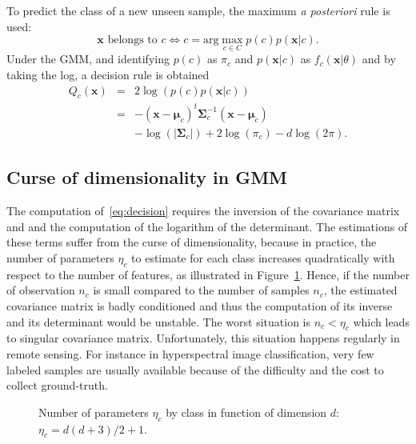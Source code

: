 \documentclass[journal,peerreview,onecolumn]{IEEEtran}
\begin{document}
    To predict the  class of a new unseen sample,  the maximum \emph{a
      posteriori}  rule  is  used:
    \begin{equation*}
        \mathbf{x} \text{ belongs to } c \Leftrightarrow c = \text{arg} \max_{c \in C} p(c) p(\mathbf{x}|c).
    \end{equation*}
    Under the GMM,  and identifying $p(c)$ as $\pi_c$  and $p(\mathbf{x}|c)$ as
    $f_c(\mathbf{x}|\theta)$ and by taking the log, a decision rule is obtained
    \begin{eqnarray}\label{eq:decision}
      Q_c(\mathbf{x}) &=& 2 \log \left( p(c) p(\mathbf{x}|c) \right) \nonumber \\
                      &=& - (\mathbf{x} - \boldsymbol{\mu}_c)^t \boldsymbol{\Sigma}_c^{-1} (\mathbf{x} - \boldsymbol{\mu}_c) \nonumber \\
                      & &-\log (|\boldsymbol{\Sigma}_c|) + 2 \log (\pi_c) - d \log (2\pi).
    \end{eqnarray}

    \subsection{Curse of dimensionality in GMM}
    \label{sec:curse:gmm}

    The computation of~\ref{eq:decision} requires the inversion of the
    covariance matrix and and the  computation of the logarithm of the
    determinant.  The estimations of these terms suffer from the curse
    of  dimensionality\cite{bouveyron2014model}, because  in practice,
    the  number of  parameters  $\eta_c$ to  estimate  for each  class
    increases quadratically with respect to the number of features, as
    illustrated in Figure~\ref{fig:nb-param}.  Hence, if the number of
    observation  $n_c$ is  small  compared to  the  number of  samples
    $n_c$, the  estimated covariance  matrix is badly  conditioned and
    thus the computation  of its inverse and its  determinant would be
    unstable.   The worst  situation  is $n_c<\eta_c$  which leads  to
    singular covariance matrix.  Unfortunately, this situation happens
    regularly in remote sensing.   For instance in hyperspectral image
    classification,  very few  labeled samples  are usually  available
    because of the difficulty and the cost to collect ground-truth.

    \begin{figure}[!t]
        \centering
        \caption{Number of parameters $\eta_c$ by class in function of dimension $d$: $\eta_c=d(d+3)/2+1$.\label{fig:nb-param}}
    \end{figure}
\end{document}
